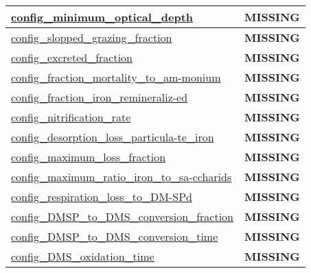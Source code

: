 {\begin{center}
\begin{longtable}{| p{2.0in} || p{4.0in} |}
    \hline
    \hyperref[subsec:nm_sec_config_minimum_optical_depth]{config\_minimum\_optical\_depth} & {\bf \color{red} MISSING} \\
    \hline
    \hyperref[subsec:nm_sec_config_slopped_grazing_fraction]{config\_slopped\_grazing\_fraction} & {\bf \color{red} MISSING} \\
    \hline
    \hyperref[subsec:nm_sec_config_excreted_fraction]{config\_excreted\_fraction} & {\bf \color{red} MISSING} \\
    \hline
    \hyperref[subsec:nm_sec_config_fraction_mortality_to_ammonium]{config\_fraction\_mortality\_to\_am-}\hyperref[subsec:nm_sec_config_fraction_mortality_to_ammonium]{monium}& {\bf \color{red} MISSING} \\
    \hline
    \hyperref[subsec:nm_sec_config_fraction_iron_remineralized]{config\_fraction\_iron\_remineraliz-}\hyperref[subsec:nm_sec_config_fraction_iron_remineralized]{ed}& {\bf \color{red} MISSING} \\
    \hline
    \hyperref[subsec:nm_sec_config_nitrification_rate]{config\_nitrification\_rate} & {\bf \color{red} MISSING} \\
    \hline
    \hyperref[subsec:nm_sec_config_desorption_loss_particulate_iron]{config\_desorption\_loss\_particula-}\hyperref[subsec:nm_sec_config_desorption_loss_particulate_iron]{te\_iron}& {\bf \color{red} MISSING} \\
    \hline
    \hyperref[subsec:nm_sec_config_maximum_loss_fraction]{config\_maximum\_loss\_fraction} & {\bf \color{red} MISSING} \\
    \hline
    \hyperref[subsec:nm_sec_config_maximum_ratio_iron_to_saccharids]{config\_maximum\_ratio\_iron\_to\_sa-}\hyperref[subsec:nm_sec_config_maximum_ratio_iron_to_saccharids]{ccharids}& {\bf \color{red} MISSING} \\
    \hline
    \hyperref[subsec:nm_sec_config_respiration_loss_to_DMSPd]{config\_respiration\_loss\_to\_DM-}\hyperref[subsec:nm_sec_config_respiration_loss_to_DMSPd]{SPd}& {\bf \color{red} MISSING} \\
    \hline
    \hyperref[subsec:nm_sec_config_DMSP_to_DMS_conversion_fraction]{config\_DMSP\_to\_DMS\_conversion\_fraction} & {\bf \color{red} MISSING} \\
    \hline
    \hyperref[subsec:nm_sec_config_DMSP_to_DMS_conversion_time]{config\_DMSP\_to\_DMS\_conversion\_time} & {\bf \color{red} MISSING} \\
    \hline
    \hyperref[subsec:nm_sec_config_DMS_oxidation_time]{config\_DMS\_oxidation\_time} & {\bf \color{red} MISSING} \\

\end{longtable}
\end{center}}
